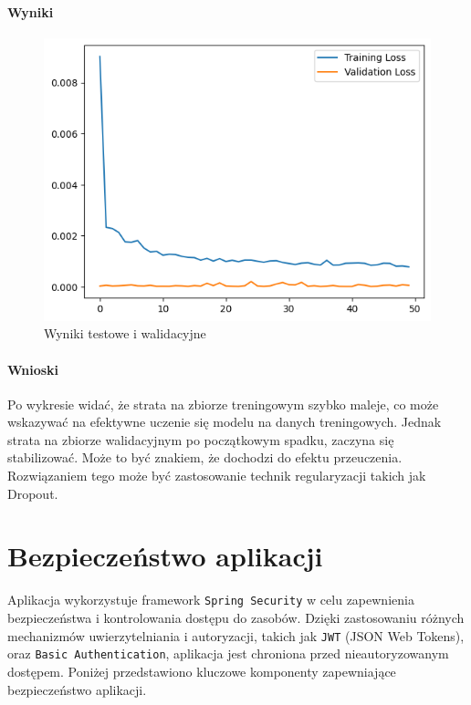 \paragraph{Wyniki}

\begin{figure}[htb]
    \centering
    \includegraphics[width=0.9\linewidth]{Wyniki_testowe_i_walidacyjne.png}
    \caption{Wyniki testowe i walidacyjne}
    \label{fig:Wyniki_testowe_i_walidacyjne}
\end{figure}

\paragraph{Wnioski}
Po wykresie widać, że strata na zbiorze treningowym szybko maleje, co może wskazywać na efektywne uczenie się modelu na danych treningowych. Jednak strata na zbiorze walidacyjnym po początkowym spadku, zaczyna się stabilizować. Może to być znakiem, że dochodzi do efektu przeuczenia. Rozwiązaniem tego może być zastosowanie technik regularyzacji takich jak Dropout.

\section{Bezpieczeństwo aplikacji}

Aplikacja wykorzystuje framework \texttt{Spring Security} w celu zapewnienia bezpieczeństwa i kontrolowania dostępu do zasobów. Dzięki zastosowaniu różnych mechanizmów uwierzytelniania i autoryzacji, takich jak \texttt{JWT} (JSON Web Tokens), oraz \texttt{Basic Authentication}, aplikacja jest chroniona przed nieautoryzowanym dostępem. Poniżej przedstawiono kluczowe komponenty zapewniające bezpieczeństwo aplikacji.

